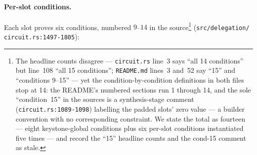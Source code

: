 \documentclass[11pt,a4paper]{article}
\theoremstyle{definition}
\begin{document}
\paragraph{Per-slot conditions.} Each slot proves six conditions, numbered
$9$--$14$ in the source\footnote{The headline counts disagree ---
\texttt{circuit.rs} line~3 says ``all 14 conditions'' but line~108 ``all 15
conditions''; \texttt{README.md} lines~3 and~52 say ``15'' and ``conditions
9--15'' --- yet the condition-by-condition definitions in both files stop
at 14: the README's numbered sections run 1 through 14, and the sole
``condition~15'' in the sources is a synthesis-stage comment
(\texttt{circuit.rs:1089-1098}) labelling the padded slots' zero value ---
a builder convention with no corresponding constraint. We state the total
as fourteen --- eight keystone-global conditions plus six per-slot
conditions instantiated five times --- and record the ``15'' headline
counts and the cond-15 comment as stale.}
(\texttt{src/\allowbreak delegation/\allowbreak
circuit.rs:1497-1805}):
\end{document}
